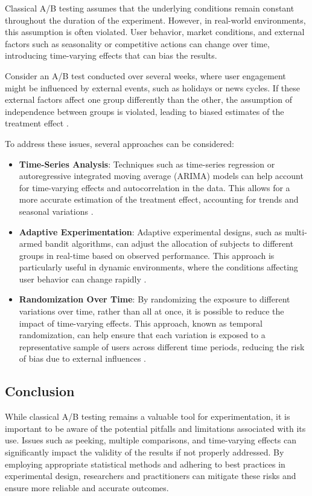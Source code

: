 \documentclass[magisterska, english]{pwr_wmat_praca_dyplomowa}
\theoremstyle{plain}
\numberwithin{theorem}{chapter}
\theoremstyle{definition}
\numberwithin{theorem}{chapter}
\begin{document}
Classical A/B testing assumes that the underlying conditions remain constant throughout the duration of the experiment. However, in real-world environments, this assumption is often violated. User behavior, market conditions, and external factors such as seasonality or competitive actions can change over time, introducing time-varying effects that can bias the results.

Consider an A/B test conducted over several weeks, where user engagement might be influenced by external events, such as holidays or news cycles. If these external factors affect one group differently than the other, the assumption of independence between groups is violated, leading to biased estimates of the treatment effect \cite{Rosenbaum2010}.

To address these issues, several approaches can be considered:
\begin{itemize}
	\item \textbf{Time-Series Analysis}: Techniques such as time-series regression or autoregressive integrated moving average (ARIMA) models can help account for time-varying effects and autocorrelation in the data. This allows for a more accurate estimation of the treatment effect, accounting for trends and seasonal variations \cite{Box2015}.
	\item \textbf{Adaptive Experimentation}: Adaptive experimental designs, such as multi-armed bandit algorithms, can adjust the allocation of subjects to different groups in real-time based on observed performance. This approach is particularly useful in dynamic environments, where the conditions affecting user behavior can change rapidly \cite{Scott2015}.
	\item \textbf{Randomization Over Time}: By randomizing the exposure to different variations over time, rather than all at once, it is possible to reduce the impact of time-varying effects. This approach, known as temporal randomization, can help ensure that each variation is exposed to a representative sample of users across different time periods, reducing the risk of bias due to external influences \cite{Montgomery2008}.
\end{itemize}

\subsection{Conclusion}
While classical A/B testing remains a valuable tool for experimentation, it is important to be aware of the potential pitfalls and limitations associated with its use. Issues such as peeking, multiple comparisons, and time-varying effects can significantly impact the validity of the results if not properly addressed. By employing appropriate statistical methods and adhering to best practices in experimental design, researchers and practitioners can mitigate these risks and ensure more reliable and accurate outcomes.
\end{document}
